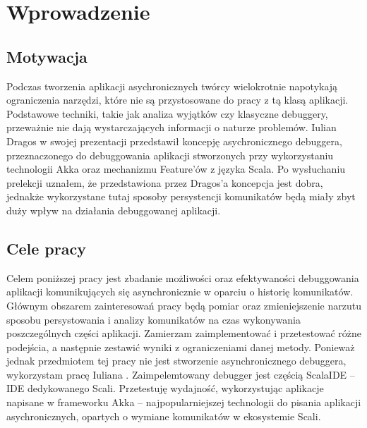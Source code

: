 \chapter{Wprowadzenie}


\section{Motywacja}

Podczas tworzenia aplikacji asychronicznych twórcy wielokrotnie napotykają ograniczenia narzędzi, które nie są przystosowane do pracy z tą klasą aplikacji. Podstawowe techniki, takie jak analiza wyjątków czy klasyczne debuggery, przeważnie nie dają wystarczających informacji o naturze problemów. Iulian Dragos w swojej prezentacji \cite{rethingningDebugger} przedstawił koncepję asychronicznego debuggera, przeznaczonego do debuggowania aplikacji stworzonych przy wykorzystaniu technologii Akka oraz mechanizmu Feature'ów z języka Scala. Po wysłuchaniu prelekcji uznałem, że przedstawiona przez Dragos'a koncepcja jest dobra, jednakże wykorzystane tutaj sposoby persystencji komunikatów będą miały zbyt duży wpływ na działania debuggowanej aplikacji.



\section{Cele pracy}


Celem poniższej pracy jest zbadanie możliwości oraz efektywaności debuggowania aplikacji komunikujących się asynchronicznie w oparciu o historię komunikatów. Głównym obszarem zainteresowań pracy będą pomiar oraz zmieniejszenie narzutu sposobu persystowania i analizy komunikatów na czas wykonywania poszczególnych części aplikacji. Zamierzam zaimplementować i przetestować różne podejścia, a następnie zestawić wyniki z ograniczeniami danej metody. Ponieważ jednak przedmiotem tej pracy nie jest stworzenie asynchronicznego debuggera, wykorzystam pracę Iuliana \cite{asychDebuggerGh}. Zaimpelemtowany debugger jest częścią ScalaIDE – IDE dedykowanego Scali. Przetestuję wydajność, wykorzystując aplikacje napisane w frameworku Akka – najpopularniejszej technologii do pisania aplikacji asychronicznych, opartych o wymiane komunikatów w ekosystemie Scali.













